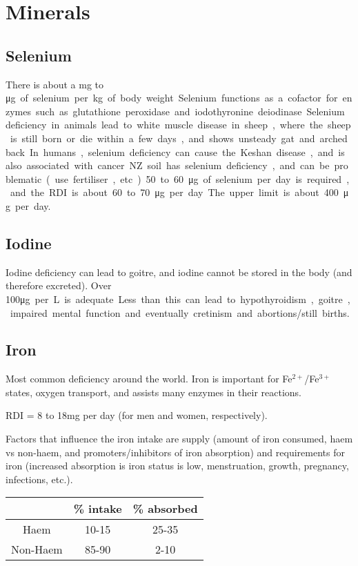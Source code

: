 \section{Minerals}

\subsection{Selenium}

There is about a mg to \si\micro g of selenium per kg of body weight.
Selenium functions as a cofactor for enzymes such as glutathione peroxidase and iodothyronine deiodinase.

Selenium deficiency in animals lead to white muscle disease in sheep, where the sheep is still born or die within a few days, and shows unsteady gat and arched back.
In humans, selenium deficiency can cause the Keshan disease, and is also associated with cancer.

NZ soil has selenium deficiency, and can be problematic (use fertiliser, etc.).
50 to 60\si\micro g of selenium per day is required, and the RDI is about 60 to 70\si\micro g per day.
The upper limit is about 400\si\micro g per day.

\subsection{Iodine}

Iodine deficiency can lead to goitre, and iodine cannot be stored in the body (and therefore excreted).
Over 100\si\micro g per L is adequate.
Less than this can lead to hypothyroidism, goitre, impaired mental function and eventually cretinism and abortions/still births.

\subsection{Iron}

Most common deficiency around the world.
Iron is important for Fe$^{2+}$/Fe$^{3+}$ states, oxygen transport, and assists many enzymes in their reactions.

RDI = 8 to 18mg per day (for men and women, respectively).

Factors that influence the iron intake are supply (amount of iron consumed, haem vs non-haem, and promoters/inhibitors of iron absorption) and requirements for iron (increased absorption is iron status is low, menstruation, growth, pregnancy, infections, etc.).

\begin{center}
\begin{tabular}{c | c | c}
& \% intake & \% absorbed \\
\hline
Haem & 10-15 & 25-35 \\
Non-Haem & 85-90 & 2-10\\
\end{tabular}
\end{center}

